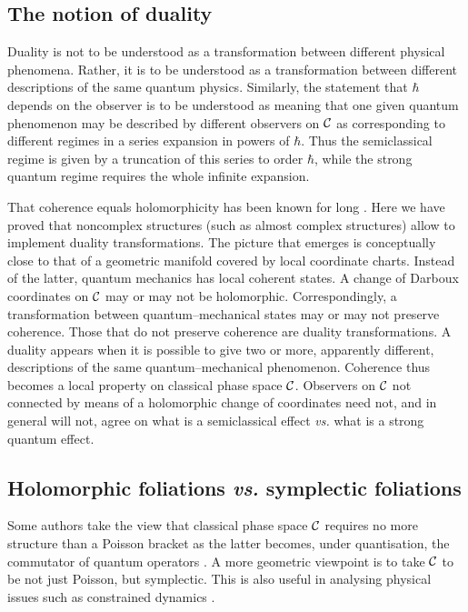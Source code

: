\documentclass[a4paper,a4paper]{article}
\begin{document}
\subsection{The notion of duality}\label{notdual}

Duality is not to be understood as a transformation between different physical 
phenomena. Rather, it is to be understood as a transformation between different 
descriptions of the same quantum physics. Similarly, the statement that $\hbar$ 
depends on the observer is to be understood as meaning that one given quantum 
phenomenon may be described by different observers on ${\cal C}$ as corresponding 
to different regimes in a series expansion in powers of $\hbar$. Thus
the semiclassical regime is given by a truncation of this series to order $\hbar$, 
while the strong quantum regime requires the whole infinite expansion.

That coherence equals holomorphicity has been known for long \cite{LONG}.
Here we have proved that noncomplex structures (such as almost 
complex structures) allow to implement duality transformations.
The picture that emerges is conceptually close to that of a 
geometric manifold covered by local coordinate charts. Instead of the 
latter, quantum mechanics has local coherent states. A change of Darboux
coordinates on ${\cal C}$ may or may not be holomorphic. Correspondingly, 
a transformation between quantum--mechanical states may or may not preserve 
coherence. Those that do not preserve coherence are duality transformations. 
A duality appears when it is possible to give two or more, apparently different, 
descriptions of the same quantum--mechanical phenomenon. Coherence thus becomes 
a local property on classical phase space ${\cal C}$. Observers on ${\cal C}$ not 
connected by means of a holomorphic change of coordinates need not, and in general 
will not, agree on what is a semiclassical effect {\it vs.} what is a strong quantum 
effect. 

\subsection{Holomorphic foliations  {\it vs.} symplectic foliations}
\label{poistruct}

Some authors take the view that classical phase space ${\cal C}$ requires no more 
structure than a Poisson bracket as the latter becomes, under quantisation, 
the commutator of quantum operators \cite{DIRAC}. A more geometric 
viewpoint \cite{ARNOLD, GQUANT} is to take ${\cal C}$ to be not just Poisson, 
but symplectic. This is also useful in analysing physical issues such as constrained 
dynamics \cite{JACKIW}. 
\end{document}
